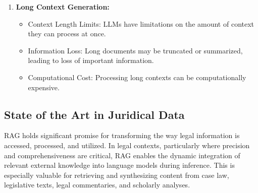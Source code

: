 \begin{enumerate}
\begin{itemize}
	\end{itemize}
	\item \textbf{Long Context Generation:}
	\begin{itemize}
		\item Context Length Limits: LLMs have limitations on the amount of context they can process at once.
		\item Information Loss: Long documents may be truncated or summarized, leading to loss of important information.
		\item Computational Cost: Processing long contexts can be computationally expensive.
	\end{itemize}
\end{enumerate}

\subsection{State of the Art in Juridical Data}
RAG holds significant promise for transforming the way legal information is accessed, processed, and utilized. In legal contexts, particularly where precision and comprehensiveness are critical, RAG enables the dynamic integration of relevant external knowledge into language models during inference. This is especially valuable for retrieving and synthesizing content from case law, legislative texts, legal commentaries, and scholarly analyses\citep{lexemoRAG}.


